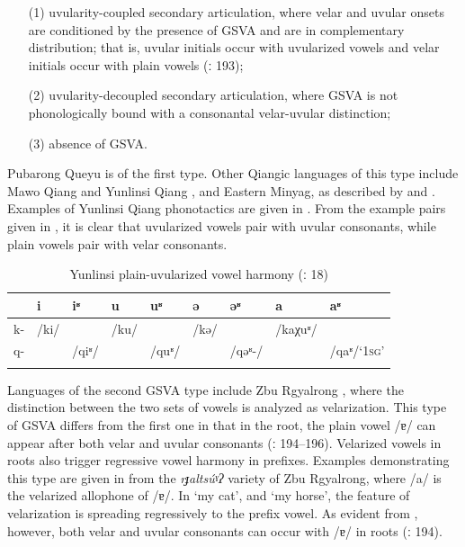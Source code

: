 \documentclass[output=paper]{langscibook}
\begin{document}
\begin{enumerate}
\item[(1)] uvularity-coupled secondary articulation, where velar and uvular onsets are conditioned by the presence of GSVA and are in complementary distribution; that is, uvular initials occur with uvularized vowels and velar initials occur with plain vowels (\citealt{Gong2020}ː 193);
\item[(2)] uvularity-decoupled secondary articulation, where GSVA is not phonologically bound with a consonantal velar-uvular distinction;
\item[(3)] absence of GSVA.
\end{enumerate}

Pubarong Queyu is of the first type. Other Qiangic languages of this type include Mawo Qiang and Yunlinsi Qiang \citep{EvansEtAl2016}, and Eastern Minyag, as described by \citet{Huang1985} and \citet{Gao2015}. Examples of Yunlinsi Qiang phonotactics are given in . From the example pairs given in , it is clear that uvularized vowels pair with uvular consonants, while plain vowels pair with velar consonants.

\begin{table}
\caption{Yunlinsi plain-uvularized vowel harmony (\citealt{EvansEtAl2016}ː 18)}
\label{tab:guan:12}
\begin{tabularx}{\textwidth}{l Q@{}Q@{}Q@{}Q@{}Q@{}p{1.5cm}@{}p{1.8cm}@{}p{1cm}}
\lsptoprule
& {i} & {iʶ} & {u} & {uʶ} & {ə} & {əʶ} & {a} & {aʶ}\\
\midrule
{k-} & {/ki/} &  & {/ku/} &  & {/kə/} &  & {/kaχuʶ/} & \\
{q-} &  & {/qiʶ/} &  & {/quʶ/} &  & {/qəʶ-/} &  & {/qaʶ/}\newline \textsc{‘1sg’}\\
\lspbottomrule
\end{tabularx}
\end{table}


Languages of the second GSVA type include Zbu Rgyalrong \citep{Sun2004}, where the distinction between the two sets of vowels is analyzed as velarization. This type of GSVA differs from the first one in that in the root, the plain vowel /ɐ/ can appear after both velar and uvular consonants (\citealt{Gong2020}ː 194--196). Velarized vowels in roots also trigger regressive vowel harmony in prefixes. Examples demonstrating this type are given in  from the \textit{rɟaltsúˠʔ} variety of Zbu Rgyalrong, where /a/ is the velarized allophone of /ɐ/. In ‘my cat’, and ‘my horse’, the feature of velarization is spreading regressively to the prefix vowel. As evident from , however, both velar and uvular consonants can occur with \mbox{/ɐ/} in roots (\citealt{Gong2020}ː 194).
\end{document}
